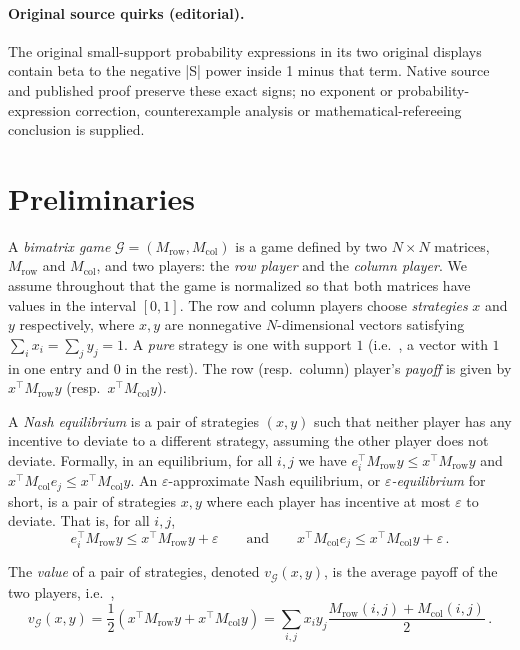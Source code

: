 \documentclass[10pt]{article}
\theoremstyle{definition}
\providecommand{\ie}{i.e.\ }
\numberwithin{equation}{section}
\newcommand{\eps}{\varepsilon}
\newcommand{\G}{\mathcal{G}}
\begin{document}
\paragraph{Original source quirks (editorial).} The original small-support probability expressions in its two original displays contain beta to the negative |S| power inside 1 minus that term. Native source and published proof preserve these exact signs; no exponent or probability-expression correction, counterexample analysis or mathematical-refereeing conclusion is supplied.
\clearpage
\setcounter{section}{1}
\section{Preliminaries}

%
%
%
%

A \emph{bimatrix game} $\G = (M_{\mathrm{row}}, M_{\mathrm{col}})$ is
a game defined by two $N \times N$ matrices, $M_{\mathrm{row}}$
and $M_{\mathrm{col}}$, and two players: the \emph{row player} and the
\emph{column player}. We assume throughout that the game is normalized
so that both matrices have values in the interval $[0,1]$. The row and
column players choose \emph{strategies} $x$ and $y$ respectively,
where $x,y$ are nonnegative $N$-dimensional vectors satisfying
$\sum_ix_i=\sum_jy_j=1$.  A \emph{pure} strategy is one with support
$1$ (\ie, a vector with $1$ in one entry and $0$ in the rest). The
row (resp.\ column) player's \emph{payoff} is given by
$x^{\top}M_{\mathrm{row}}y$ (resp.\ $x^{\top}M_{\mathrm{col}}y$).

A \emph{Nash equilibrium} is a pair of strategies $(x,y)$ such that
neither player has any incentive to deviate to a different strategy,
assuming the other player does not deviate. Formally, in an
equilibrium, for all $i,j$ we have $e_i^{\top}M_{\mathrm{row}}y\leq
x^{\top}M_{\mathrm{row}}y$ and $x^{\top}M_{\mathrm{col}}e_j\leq
x^{\top}M_{\mathrm{col}}y$. An $\eps$-approximate Nash equilibrium, or
\emph{$\eps$-equilibrium} for short, is a pair of strategies $x,y$
where each player has incentive at most $\eps$ to deviate. That is,
for all $i,j$, 
\[
e_i^{\top}M_{\mathrm{row}}y\leq
x^{\top}M_{\mathrm{row}}y+\eps\qquad\text{and}\qquad
x^{\top}M_{\mathrm{col}}e_j\leq x^{\top}M_{\mathrm{col}}y+\eps\,.
\]

The \emph{value} of a pair of strategies, denoted $v_{\G}(x,y)$, is
the average payoff of the two players, \ie, 
\[
v_\G(x,y) = \frac{1}{2}(x^{\top}M_{\mathrm{row}}y +
x^{\top}M_{\mathrm{col}}y) = \sum_{i,j} x_i y_j
\frac{M_{\mathrm{row}}(i,j) + M_{\mathrm{col}}(i,j)}{2}\,.
\]
\end{document}
